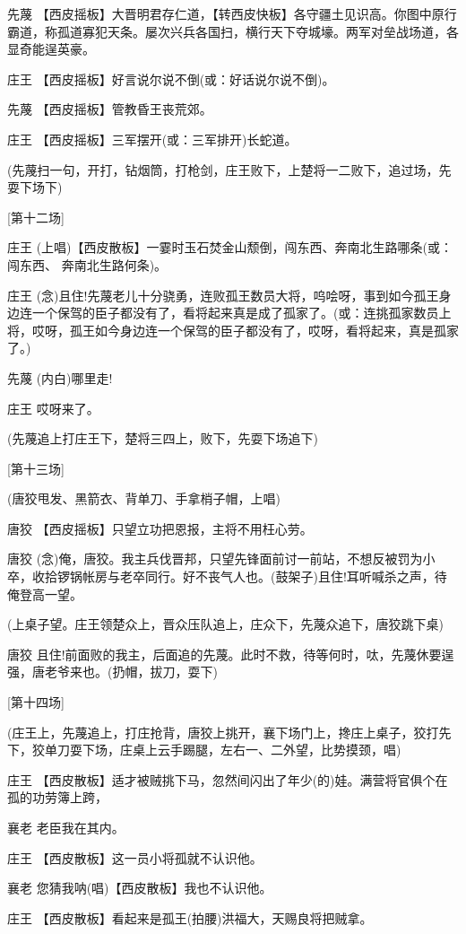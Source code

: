 先蔑
【西皮摇板】大晋明君存仁道，【转西皮快板】各守疆土见识高。你图中原行霸道，称孤道寡犯天条。屡次兴兵各国扫，横行天下夺城壕。两军对垒战场道，各显奇能逞英豪。

庄王 【西皮摇板】好言说尔说不倒(或：好话说尔说不倒)。

先蔑 【西皮摇板】管教昏王丧荒郊。

庄王 【西皮摇板】三军摆开(或：三军排开)长蛇道。

(先蔑扫一句，开打，钻烟筒，打枪剑，庄王败下，上楚将一二败下，追过场，先耍下场下)

{[}第十二场{]}

庄王
(上唱)【西皮散板】一霎时玉石焚金山颓倒，闯东西、奔南北生路哪条(或：闯东西、
奔南北生路何条)。

庄王
(念)且住!先蔑老儿十分骁勇，连败孤王数员大将，呜哙呀，事到如今孤王身边连一个保驾的臣子都没有了，看将起来真是成了孤家了。(或：连挑孤家数员上将，哎呀，孤王如今身边连一个保驾的臣子都没有了，哎呀，看将起来，真是孤家了。)

先蔑 (内白)哪里走!

庄王 哎呀来了。

(先蔑追上打庄王下，楚将三四上，败下，先耍下场追下)

{[}第十三场{]}

(唐狡甩发、黑箭衣、背单刀、手拿梢子帽，上唱)

唐狡 【西皮摇板】只望立功把恩报，主将不用枉心劳。

唐狡
(念)俺，唐狡。我主兵伐晋邦，只望先锋面前讨一前站，不想反被罚为小卒，收拾锣锅帐房与老卒同行。好不丧气人也。(鼓架子)且住!耳听喊杀之声，待俺登高一望。

(上桌子望。庄王领楚众上，晋众压队追上，庄众下，先蔑众追下，唐狡跳下桌)

唐狡
且住!前面败的我主，后面追的先蔑。此时不救，待等何时，呔，先蔑休要逞强，唐老爷来也。(扔帽，拔刀，耍下)

{[}第十四场{]}

(庄王上，先蔑追上，打庄抢背，唐狡上挑开，襄下场门上，搀庄上桌子，狡打先下，狡单刀耍下场，庄桌上云手踢腿，左右一、二外望，比势摸颈，唱)

庄王
【西皮散板】适才被贼挑下马，忽然间闪出了年少(的)娃。满营将官俱个在孤的功劳簿上跨，

襄老 老臣我在其内。

庄王 【西皮散板】这一员小将孤就不认识他。

襄老 您猜我呐(唱)【西皮散板】我也不认识他。

庄王 【西皮散板】看起来是孤王(拍腰)洪福大，天赐良将把贼拿。

